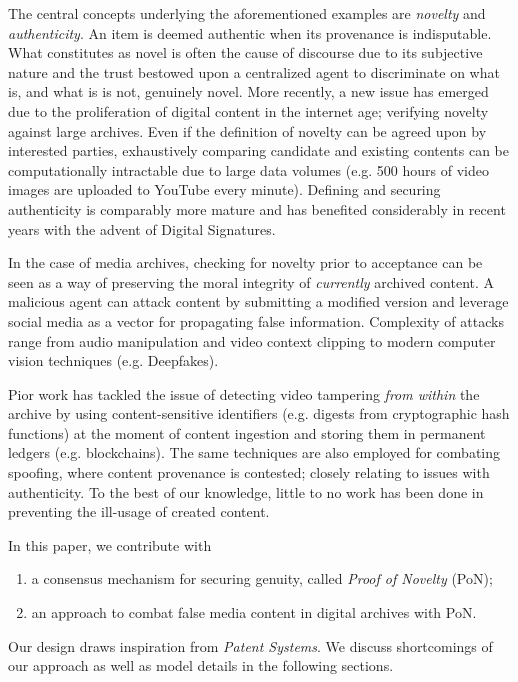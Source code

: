 \documentclass[conference]{IEEEtran}
\begin{document}
The central concepts underlying the aforementioned examples are \emph{novelty} and \emph{authenticity}. An item is deemed authentic when its provenance is indisputable. What constitutes as novel is often the cause of discourse due to its subjective nature and the trust bestowed upon a centralized agent to discriminate on what is, and what is is not, genuinely novel. More recently, a new issue has emerged due to the proliferation of digital content in the internet age; verifying novelty against large archives. Even if the definition of novelty can be agreed upon by interested parties, exhaustively comparing candidate and existing contents can be computationally intractable due to large data volumes (e.g. 500 hours of video images are uploaded to YouTube every minute). Defining and securing authenticity is comparably more mature and has benefited considerably in recent years with the advent of Digital Signatures.

In the case of media archives, checking for novelty prior to acceptance can be seen as a way of preserving the moral integrity of \emph{currently} archived content. A malicious agent can attack content by submitting a modified version and leverage social media as a vector for propagating false information. Complexity of attacks range from audio manipulation and video context clipping to modern computer vision techniques (e.g. Deepfakes). 

Pior work has tackled the issue of detecting video tampering \emph{from within} the archive by using content-sensitive identifiers (e.g. digests from cryptographic hash functions) at the moment of content ingestion and storing them in permanent ledgers (e.g. blockchains). The same techniques are also employed for combating spoofing, where content provenance is contested; closely relating to issues with authenticity. To the best of our knowledge, little to no work has been done in preventing the ill-usage of created content.

In this paper, we contribute with

\begin{enumerate}
    \item a consensus mechanism for securing genuity, called \emph{Proof of Novelty} (PoN);
    \item an approach to combat false media content in digital archives with PoN.
\end{enumerate}

Our design draws inspiration from \emph{Patent Systems}. We discuss shortcomings of our approach as well as model details in the following sections.
\end{document}
